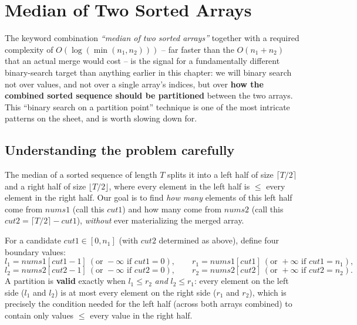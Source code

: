 \section{Median of Two Sorted Arrays}
\label{sec:bs-median-two-arrays}


\begin{patternbox}
The keyword combination \emph{``median of two sorted arrays''} together
with a required complexity of $O(\log(\min(n_1,n_2)))$ -- far faster than
the $O(n_1+n_2)$ that an actual merge would cost -- is the signal for a
fundamentally different binary-search target than anything earlier in
this chapter: we will binary search not over values, and not over a
single array's indices, but over \textbf{how the combined sorted sequence
should be partitioned} between the two arrays. This ``binary search on a
partition point'' technique is one of the most intricate patterns on the
sheet, and is worth slowing down for.
\end{patternbox}

\subsection*{Understanding the problem carefully}

The median of a sorted sequence of length $T$ splits it into a left half
of size $\lceil T/2 \rceil$ and a right half of size $\lfloor T/2
\rfloor$, where every element in the left half is $\le$ every element in
the right half. Our goal is to find \emph{how many} elements of this left
half come from $\textit{nums1}$ (call this $\textit{cut1}$) and how many
come from $\textit{nums2}$ (call this $\textit{cut2} = \lceil T/2 \rceil -
\textit{cut1}$), \emph{without} ever materializing the merged array.

For a candidate $\textit{cut1} \in [0, n_1]$ (with $\textit{cut2}$
determined as above), define four boundary values:
\[
  l_1 = \textit{nums1}[\textit{cut1}-1] \ (\text{or } -\infty \text{ if }
  \textit{cut1}=0), \qquad
  r_1 = \textit{nums1}[\textit{cut1}] \ (\text{or } +\infty \text{ if }
  \textit{cut1}=n_1),
\]
\[
  l_2 = \textit{nums2}[\textit{cut2}-1] \ (\text{or } -\infty \text{ if }
  \textit{cut2}=0), \qquad
  r_2 = \textit{nums2}[\textit{cut2}] \ (\text{or } +\infty \text{ if }
  \textit{cut2}=n_2).
\]
A partition is \textbf{valid} exactly when $l_1 \le r_2$ \emph{and}
$l_2 \le r_1$: every element on the left side ($l_1$ and $l_2$) is at most
every element on the right side ($r_1$ and $r_2$), which is precisely the
condition needed for the left half (across both arrays combined) to
contain only values $\le$ every value in the right half.

